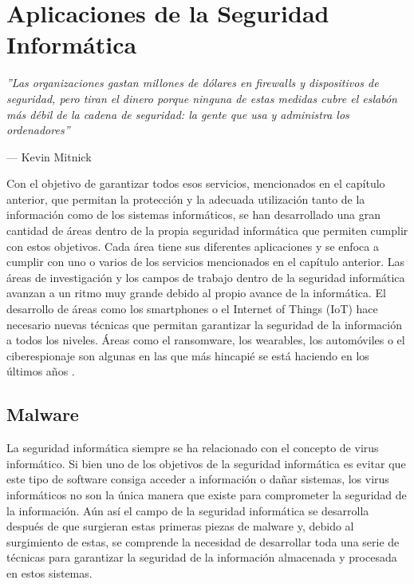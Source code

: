\chapter[Aplicaciones]{Aplicaciones de la Seguridad Informática}

\epigraph{\textit{''Las organizaciones gastan millones de dólares en firewalls y dispositivos de seguridad, pero tiran el dinero porque ninguna de estas medidas cubre el eslabón más débil de la cadena de seguridad: la gente que usa y administra los ordenadores''}}{--- Kevin Mitnick}

Con el objetivo de garantizar todos esos servicios, mencionados en el capítulo anterior, que permitan la protección y la adecuada utilización tanto de la información como de los sistemas informáticos, se han desarrollado una gran cantidad de áreas dentro de la propia seguridad informática que permiten cumplir con estos objetivos. Cada área tiene sus diferentes aplicaciones y se enfoca a cumplir con uno o varios de los servicios mencionados en el capítulo anterior.
Las áreas de investigación y los campos de trabajo dentro de la seguridad informática avanzan a un ritmo muy grande debido al propio avance de la informática. El desarrollo de áreas como los smartphones o el Internet of Things (IoT) hace necesario nuevas  técnicas que permitan garantizar la seguridad de la información a todos los niveles. Áreas como el ransomware, los wearables, los automóviles o el ciberespionaje son algunas en las que más hincapié se está haciendo en los últimos años \cite{mcafee-predictions}.


\section{Malware}

La seguridad informática siempre se ha relacionado con el concepto de virus informático. Si bien uno de los objetivos de la seguridad informática es evitar que este tipo de software consiga acceder a información o dañar sistemas, los virus informáticos no son la única manera que existe para comprometer la seguridad de la información. Aún así el campo de la seguridad informática se desarrolla después de que surgieran estas primeras piezas de malware y, debido al surgimiento de estas, se comprende la necesidad de desarrollar toda una serie de técnicas para garantizar la seguridad de la información almacenada y procesada en estos sistemas.

